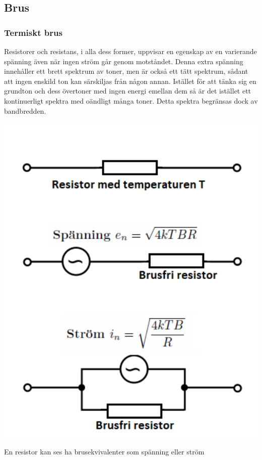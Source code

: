 \subsection{Brus}
\label{termisktbrus}

\subsubsection{Termiskt brus}

Resistorer och resistans, i alla dess former, uppvisar en egenskap av
en varierande spänning även när ingen ström går genom motståndet.
Denna extra spänning innehåller ett brett spektrum av toner, men är
också ett tätt spektrum, sådant att ingen enskild ton kan särskiljas
från någon annan.
  Istället för att tänka sig en grundton och dess övertoner med ingen
energi emellan dem så är det istället ett kontinuerligt spektra med
oändligt många toner.
Detta spektra begränsas dock av bandbredden.

\begin{marginfigure}
  \includegraphics[width=\textwidth]{images/cropped_pdfs/bild_2_1-36.pdf}
  \caption{En resistor kan ses ha brusekvivalenter som spänning eller ström}
  \label{fig:BildII1-36}
\end{marginfigure}

